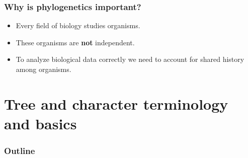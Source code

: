 \begin{frame}
    \frametitle{Why is phylogenetics important?}
    \begin{itemize}
        \item Every field of biology studies organisms.
        \item These organisms are \textbf{not} independent.
        \item To analyze biological data correctly we need to account for
            shared history among organisms.
    \end{itemize}
\end{frame}


\section{Tree and character terminology and basics}

\begin{frame}
\frametitle{Outline}
\tableofcontents[currentsection]
\end{frame}


